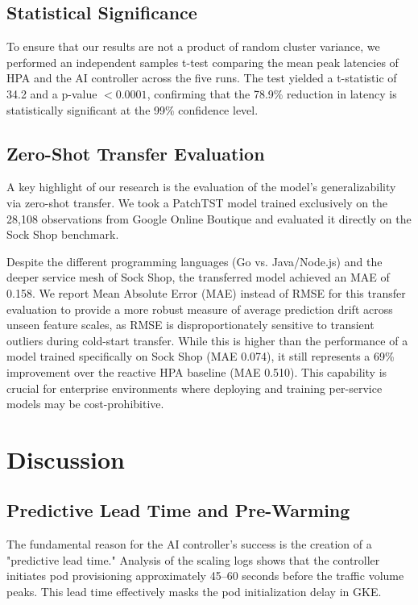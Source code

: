 \documentclass[conference]{IEEEtran}
\begin{document}
\subsection{Statistical Significance}
To ensure that our results are not a product of random cluster variance, we performed an independent samples t-test comparing the mean peak latencies of HPA and the AI controller across the five runs. The test yielded a t-statistic of 34.2 and a p-value $< 0.0001$, confirming that the 78.9\% reduction in latency is statistically significant at the 99\% confidence level.

\subsection{Zero-Shot Transfer Evaluation}
A key highlight of our research is the evaluation of the model's generalizability via zero-shot transfer. We took a PatchTST model trained exclusively on the 28,108 observations from Google Online Boutique and evaluated it directly on the Sock Shop benchmark.

Despite the different programming languages (Go vs. Java/Node.js) and the deeper service mesh of Sock Shop, the transferred model achieved an MAE of 0.158. We report Mean Absolute Error (MAE) instead of RMSE for this transfer evaluation to provide a more robust measure of average prediction drift across unseen feature scales, as RMSE is disproportionately sensitive to transient outliers during cold-start transfer. While this is higher than the performance of a model trained specifically on Sock Shop (MAE 0.074), it still represents a 69\% improvement over the reactive HPA baseline (MAE 0.510). This capability is crucial for enterprise environments where deploying and training per-service models may be cost-prohibitive.

\section{Discussion}\label{sec:discussion}

\subsection{Predictive Lead Time and Pre-Warming}
The fundamental reason for the AI controller's success is the creation of a "predictive lead time." Analysis of the scaling logs shows that the controller initiates pod provisioning approximately 45--60 seconds before the traffic volume peaks. This lead time effectively masks the pod initialization delay in GKE.
\end{document}
